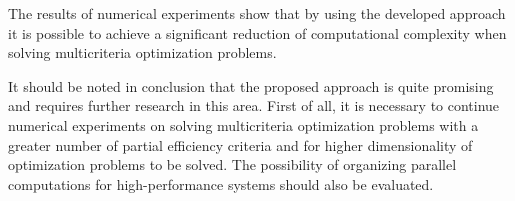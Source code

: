 \documentclass[runningheads]{llncs}
\begin{document}
The results of numerical experiments show that by using the developed approach it is possible to achieve a significant reduction of computational complexity when solving multicriteria optimization problems. 

It should be noted in conclusion that the proposed approach is quite promising and requires further research in this area. First of all, it is necessary to continue numerical experiments on solving multicriteria optimization problems with a greater number of partial efficiency criteria and for higher dimensionality of optimization problems to be solved. The possibility of organizing parallel computations for high-performance systems should also be evaluated.


%
%
%
\end{document}
